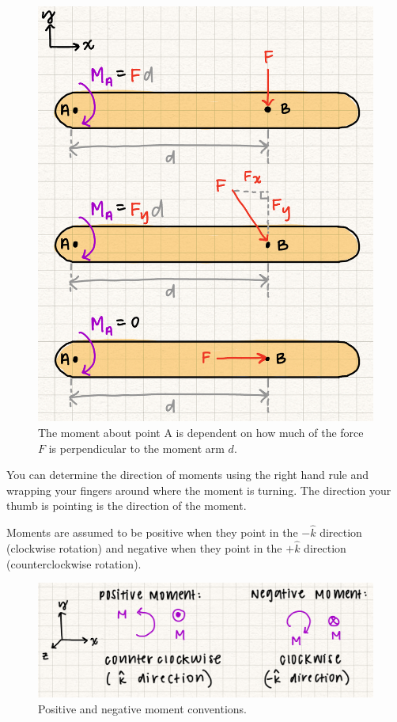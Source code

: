 \begin{figure}[!h]
\centering
\includegraphics[angle=0, width=5in]{MomentsFigures/MomentScalar.jpg}
\vspace{-2mm}
\caption{\small The moment about point A is dependent on how much of the force $F$ is perpendicular to the moment arm $d$.}
\vspace{-3mm}
\label{Fig:MomentScalar}
\end{figure}



You can determine the direction of moments using the right hand rule and wrapping your fingers around where the moment is turning. The direction your thumb is pointing is the direction of the moment. 

Moments are assumed to be positive when they point in the $-\hat{k}$ direction (clockwise rotation) and negative when they point in the $+\hat{k}$ direction (counterclockwise rotation). 

\begin{figure}[!h]
\centering
\includegraphics[angle=0, width=5in]{MomentsFigures/MomentConventions.jpg}
\vspace{-2mm}
\caption{\small Positive and negative moment conventions.}
\vspace{-3mm}
\label{Fig:MomentConventions}
\end{figure}

